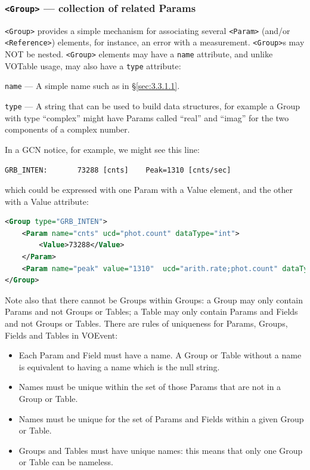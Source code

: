 \documentclass[11pt,a4paper]{ivoa}
\begin{document}
\subsubsection{{\tt <Group>} --- collection of related Params}
\label{sec:3.3.2}
{\tt <Group>} provides a simple mechanism for associating several {\tt <Param>} (and/or {\tt <Reference>}) elements, for instance, an error with a measurement. {\tt <Group>}s may NOT be nested. {\tt <Group>} elements may have a {\tt name} attribute, and unlike VOTable usage, may also have a {\tt type} attribute: 

 {\tt name}\label{sec:3.3.2.1} --- A simple name such as in \S\ref{sec:3.3.1.1}. 

 {\tt type}\label{sec:3.3.2.2} --- A string that can be used to build data structures, for example a Group with type ``complex'' might have Params called ``real'' and ``imag'' for the two components of a complex number. 

In a GCN notice, for example, we might see this line: 
\begin{lstlisting}[language=XML]
GRB_INTEN:       73288 [cnts]    Peak=1310 [cnts/sec] 
\end{lstlisting}
which could be expressed with one Param with a Value element, and the other with a Value attribute: 
\begin{lstlisting}[language=XML]
<Group type="GRB_INTEN">
    <Param name="cnts" ucd="phot.count" dataType="int">
        <Value>73288</Value>
    </Param>
    <Param name="peak" value="1310"  ucd="arith.rate;phot.count" dataType="float"/>
</Group> 
\end{lstlisting}
Note also that there cannot be Groups within Groups: a Group may only contain Params and not Groups or Tables; a Table may only contain Params and Fields and not Groups or Tables. There are rules of uniqueness for Params, Groups, Fields and Tables in VOEvent: 
\begin{itemize}
\item Each Param and Field must have a name. A Group or Table without a name is equivalent to having a name which is the null string. 
\item Names must be unique within the set of those Params that are not in a Group or Table.
\item Names must be unique for the set of Params and Fields within a given Group or Table.
\item Groups and Tables must have unique names: this means that only one Group or Table can be nameless.
\end{itemize}
\end{document}
